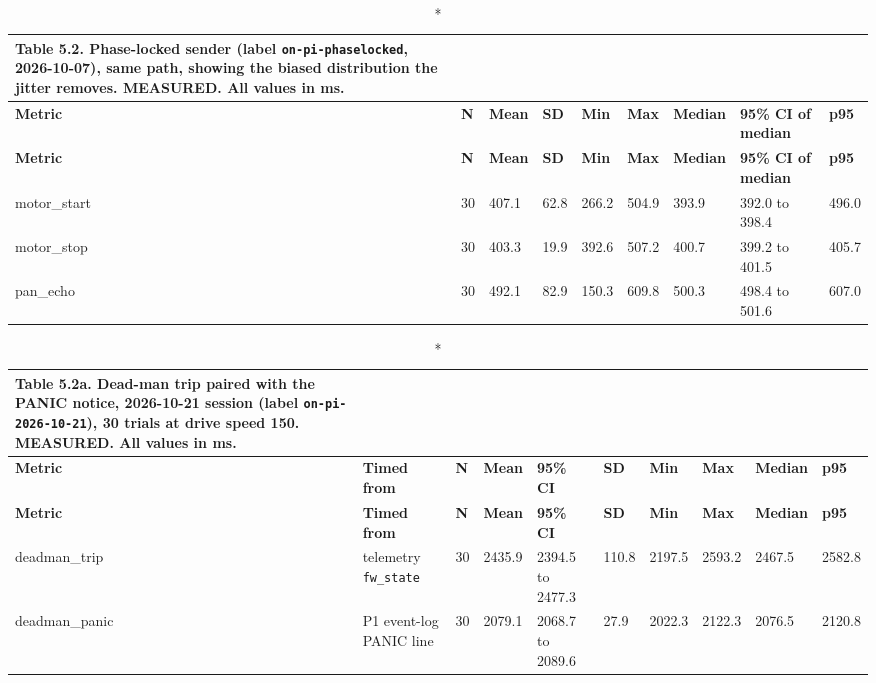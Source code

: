 \begin{center}
\footnotesize
\begin{longtable}{|p{1.7cm}|p{0.5cm}|p{1.1cm}|p{0.9cm}|p{1.1cm}|p{1.1cm}|p{1.3cm}|p{2.3cm}|p{1.0cm}|}
\caption*{Table 5.2. Phase-locked sender (label \texttt{on-pi-phaselocked}, 2026-10-07), same path, showing the biased distribution the jitter removes. MEASURED. All values in ms.}
\addcontentsline{lot}{table}{\protect\numberline{5.2}Phase-locked sender (label \texttt{on-pi-phaselocked}, 2026-10-07), same path, showing the biased distribution the jitter removes. MEASURED. All values in ms.}
\\
\hline
\textbf{Metric} & \textbf{N} & \textbf{Mean} & \textbf{SD} & \textbf{Min} & \textbf{Max} & \textbf{Median} & \textbf{95\% CI of median} & \textbf{p95} \\
\hline
\endfirsthead
\hline
\textbf{Metric} & \textbf{N} & \textbf{Mean} & \textbf{SD} & \textbf{Min} & \textbf{Max} & \textbf{Median} & \textbf{95\% CI of median} & \textbf{p95} \\
\hline
\endhead
motor\_start & 30 & 407.1 & 62.8 & 266.2 & 504.9 & 393.9 & 392.0 to 398.4 & 496.0 \\
\hline
motor\_stop & 30 & 403.3 & 19.9 & 392.6 & 507.2 & 400.7 & 399.2 to 401.5 & 405.7 \\
\hline
pan\_echo & 30 & 492.1 & 82.9 & 150.3 & 609.8 & 500.3 & 498.4 to 501.6 & 607.0 \\
\hline
\end{longtable}
\end{center}

\begin{center}
\scriptsize
\begin{longtable}{|p{1.75cm}|p{2.0cm}|p{0.4cm}|p{0.85cm}|p{1.9cm}|p{0.65cm}|p{0.85cm}|p{0.85cm}|p{1.0cm}|p{0.85cm}|}
\caption*{Table 5.2a. Dead-man trip paired with the PANIC notice, 2026-10-21 session (label \texttt{on-pi-2026-10-21}), 30 trials at drive speed 150. MEASURED. All values in ms.}
\addcontentsline{lot}{table}{\protect\numberline{5.2a}Dead-man trip paired with the PANIC notice, 2026-10-21 session (label \texttt{on-pi-2026-10-21}), 30 trials at drive speed 150. MEASURED. All values in ms.}
\\
\hline
\textbf{Metric} & \textbf{Timed from} & \textbf{N} & \textbf{Mean} & \textbf{95\% CI} & \textbf{SD} & \textbf{Min} & \textbf{Max} & \textbf{Median} & \textbf{p95} \\
\hline
\endfirsthead
\hline
\textbf{Metric} & \textbf{Timed from} & \textbf{N} & \textbf{Mean} & \textbf{95\% CI} & \textbf{SD} & \textbf{Min} & \textbf{Max} & \textbf{Median} & \textbf{p95} \\
\hline
\endhead
deadman\_trip & telemetry \texttt{fw\_state} & 30 & 2435.9 & 2394.5 to 2477.3 & 110.8 & 2197.5 & 2593.2 & 2467.5 & 2582.8 \\
\hline
deadman\_panic & P1 event-log PANIC line & 30 & 2079.1 & 2068.7 to 2089.6 & 27.9 & 2022.3 & 2122.3 & 2076.5 & 2120.8 \\
\hline
\end{longtable}
\end{center}

